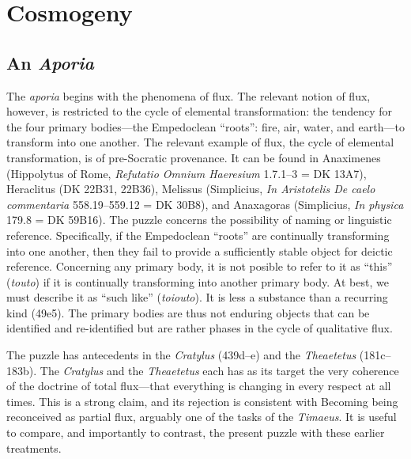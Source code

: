 
\chapter{Cosmogeny} %
\label{cha:cosmogeny}

\section{An \emph{Aporia}} %
\label{sec:an_emph_aporia}

The \emph{aporia} begins with the phenomena of flux. The relevant notion of flux, however, is restricted to the cycle of elemental transformation: the tendency for the four primary bodies---the Empedoclean ``roots'': fire, air, water, and earth---to transform into one another. The relevant example of flux, the cycle of elemental transformation, is of pre-Socratic provenance. It can be found in Anaximenes (Hippolytus of Rome, \emph{Refutatio Omnium Haeresium} 1.7.1--3 = DK 13A7), Heraclitus (DK 22B31, 22B36), Melissus (Simplicius, \emph{In Aristotelis De caelo commentaria} 558.19--559.12 = DK 30B8), and Anaxagoras (Simplicius, \emph{In physica} 179.8 = DK 59B16). The puzzle concerns the possibility of naming or linguistic reference. Specifically, if the Empedoclean ``roots'' are continually transforming into one another, then they fail to provide a sufficiently stable object for deictic reference. Concerning any primary body, it is not posible to refer to it as ``this'' (\emph{touto}) if it is continually transforming into another primary body. At best, we must describe it as ``such like'' (\emph{toiouto}). It is less a substance than a recurring kind (49e5). The primary bodies are thus not enduring objects that can be identified and re-identified but are rather phases in the cycle of qualitative flux.

The puzzle has antecedents in the \emph{Cratylus} (439d--e) and the \emph{Theaetetus} (181c--183b). The \emph{Cratylus} and the \emph{Theaetetus} each has as its target the very coherence of the doctrine of total flux---that everything is changing in every respect at all times. This is a strong claim, and its rejection is consistent with Becoming being reconceived as partial flux, arguably one of the tasks of the \emph{Timaeus}. It is useful to compare, and importantly to contrast, the present puzzle with these earlier treatments. 

